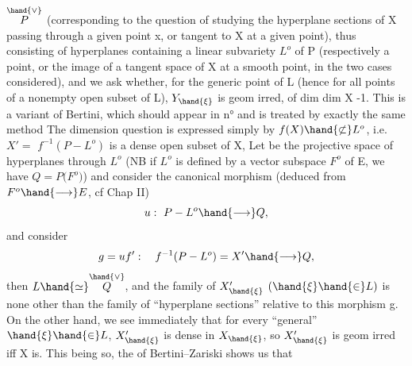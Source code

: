
$\overset{\hand{\vee}}{P}$ (corresponding to the question of studying the hyperplane sections of X
passing through a given point x, or tangent to X at a given  point),
thus consisting of hyperplanes containing a linear subvariety $L^{o}$ of P
(respectively a point, or the image of a tangent space of X at a smooth point,
in the two cases considered), and we ask whether,
for the generic point \hand{$\xi$} of L (hence for all points of a nonempty
open subset of L), $Y_{\hand{\xi}}$ is  geom irred, of
dim dim X -1. This is a variant of Bertini, which should appear
in n° and is treated by exactly the same method The dimension
question is expressed simply by $f(X)\hand{\not\subset} L^{o}$, 
i.e. $X' =$  $f^{-1}(P - L^{o})$ is a dense open subset of X, 
Let  be the projective space of hyperplanes through $L^{o}$ (NB if $L^{o}$ is
defined by a vector subspace $F^{o}$ of E, we have $Q = P($$F^{o})$) and
consider the canonical morphism (deduced from  $F^{o}\hand{\longrightarrow} E$, cf
Chap II)
\[ u :\ P - L^{o} \hand{\longrightarrow} Q, \]
and consider
\[ g = u f' :\quad f^{-1}(P - L^{o}) = X' \hand{\longrightarrow} Q , \]
then  $L \hand{\simeq} \overset{\hand{\vee}}{Q}$, and the family of
$X'_{\hand{\xi}}$ $(\hand{\xi}\hand{\in} L)$ is none other than the family of “hyperplane sections” relative
to this morphism g. On the other hand, we see immediately that for every
“general” $\hand{\xi}\hand{\in} L$, $X'_{\hand{\xi}}$ is dense in $X_{\hand{\xi}}$, so $X'_{\hand{\xi}}$ is geom irred iff
X is. This being so, the  of Bertini–Zariski shows us that
